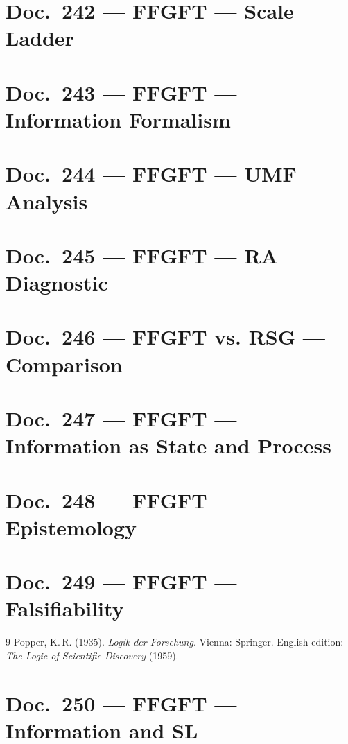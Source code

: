 	\chapter{Doc.~242 --- FFGFT — Scale Ladder}
	
	\chapter{Doc.~243 --- FFGFT — Information Formalism}
	
	\chapter{Doc.~244 --- FFGFT — UMF Analysis}
	
	\chapter{Doc.~245 --- FFGFT — RA Diagnostic}
	
	\chapter{Doc.~246 --- FFGFT vs. RSG — Comparison}
	
	\chapter{Doc.~247 --- FFGFT — Information as State and Process}
	
	\chapter{Doc.~248 --- FFGFT — Epistemology}
	
	\chapter{Doc.~249 --- FFGFT — Falsifiability}
	
	\begin{thebibliography}{9}
	Popper, K.\,R. (1935). \emph{Logik der Forschung}. Vienna: Springer. English edition: \emph{The Logic of Scientific Discovery} (1959).
	\end{thebibliography}
	\chapter{Doc.~250 --- FFGFT — Information and SL}
	
